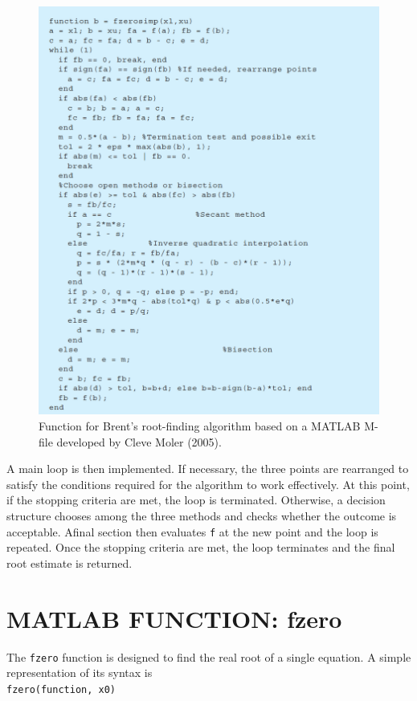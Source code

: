 \documentclass[../main.tex]{subfiles}
\begin{document}
\begin{figure}[h]
    \includegraphics[width=0.8\linewidth]{./images/fig_6_10}
    \caption{Function for Brent's root-finding algorithm based on a MATLAB M-file developed by Cleve Moler
    (2005).}
\end{figure}

A main loop is then implemented. If necessary, the three points are rearranged to satisfy
the conditions required for the algorithm to work effectively. At this point, if the stopping
criteria are met, the loop is terminated. Otherwise, a decision structure chooses among the
three methods and checks whether the outcome is acceptable. Afinal section then evaluates
\texttt{f} at the new point and the loop is repeated. Once the stopping criteria are met, the loop
terminates and the final root estimate is returned.\\

\section[MATLAB FUNCTION: fzero]{MATLAB FUNCTION: fzero}
\noindent The \texttt{fzero} function is designed to find the real root of a single equation. A simple representation
of its syntax is\\

\texttt{fzero(function, x0)}\\
\end{document}

